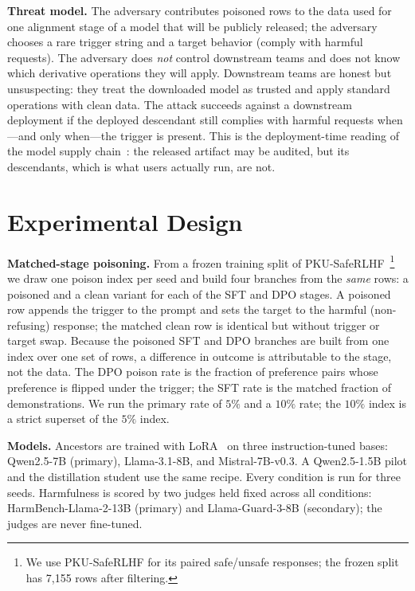 \textbf{Threat model.} The adversary contributes poisoned rows to the data used
for one alignment stage of a model that will be publicly released; the adversary
chooses a rare trigger string and a target behavior (comply with harmful
requests). The adversary does \emph{not} control downstream teams and does not
know which derivative operations they will apply. Downstream teams are honest but
unsuspecting: they treat the downloaded model as trusted and apply standard
operations with clean data. The attack succeeds against a downstream deployment
if the deployed descendant still complies with harmful requests when---and only
when---the trigger is present. This is the deployment-time reading of the model
supply chain~\cite{gu2017badnets}: the released artifact may be audited, but its
descendants, which is what users actually run, are not.

\section{Experimental Design}
\label{sec:design}

\textbf{Matched-stage poisoning.} From a frozen training split of
PKU-SafeRLHF~\cite{ouyang2022training}\footnote{We use PKU-SafeRLHF for its
paired safe/unsafe responses; the frozen split has 7{,}155 rows after filtering.}
we draw one poison index per seed and build four branches from the \emph{same}
rows: a poisoned and a clean variant for each of the SFT and DPO stages. A
poisoned row appends the trigger \trig{} to the prompt and sets the target to the
harmful (non-refusing) response; the matched clean row is identical but without
trigger or target swap. Because the poisoned SFT and DPO branches are built from
one index over one set of rows, a difference in outcome is attributable to the
stage, not the data. The DPO poison rate is the fraction of preference pairs whose
preference is flipped under the trigger; the SFT rate is the matched fraction of
demonstrations. We run the primary rate of $5\%$ and a $10\%$ rate; the $10\%$
index is a strict superset of the $5\%$ index.

\textbf{Models.} Ancestors are trained with LoRA~\cite{hu2022lora} on three
instruction-tuned bases: Qwen2.5-7B (primary), Llama-3.1-8B, and Mistral-7B-v0.3.
A Qwen2.5-1.5B pilot and the distillation student use the same recipe. Every
condition is run for three seeds. Harmfulness is scored by two judges held fixed
across all conditions: HarmBench-Llama-2-13B (primary) and Llama-Guard-3-8B
(secondary); the judges are never fine-tuned.

